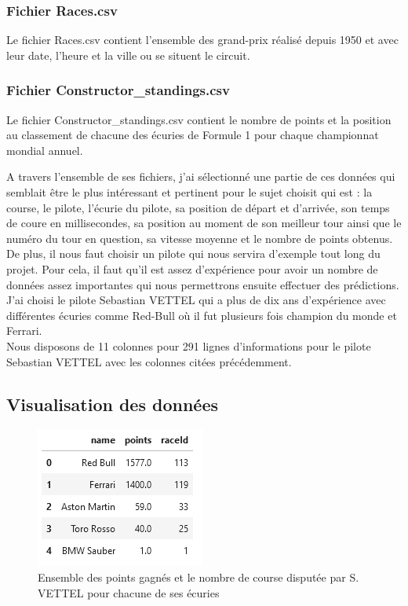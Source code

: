 \subsubsection{Fichier Races.csv}
Le fichier Races.csv contient l'ensemble des grand-prix réalisé depuis 1950 et avec leur date, l'heure et la ville ou se situent le circuit.

\subsubsection{Fichier Constructor\_standings.csv}
Le fichier Constructor\_standings.csv contient le nombre de points et la position au classement de chacune des écuries de Formule 1 pour chaque championnat mondial annuel.

\newpage

A travers l'ensemble de ses fichiers, j'ai sélectionné une partie de ces données qui semblait être le plus intéressant et pertinent pour le sujet choisit qui est : la course, le pilote, l'écurie du pilote, sa position de départ et d'arrivée, son temps de coure en millisecondes, sa position au moment de son meilleur tour ainsi que le numéro du tour en question, sa vitesse moyenne et le nombre de points obtenus. \\

De plus, il nous faut choisir un pilote qui nous servira d'exemple tout long du projet. Pour cela, il faut qu'il est assez d'expérience pour avoir un nombre de données assez importantes qui nous permettrons ensuite effectuer des prédictions. J'ai choisi le  pilote Sebastian VETTEL qui a plus de dix ans d'expérience avec différentes écuries comme Red-Bull où il fut plusieurs fois champion du monde et Ferrari.\\

Nous disposons de 11 colonnes pour 291 lignes d'informations pour le pilote Sebastian VETTEL avec les colonnes citées précédemment.\\

\subsection{Visualisation des données}
\begin{figure}[H]
    \centering
    \includegraphics[width=.4\textwidth]{images/VettelEcurieScore.png} 
    \caption{Ensemble des points gagnés et le nombre de course disputée par S. VETTEL pour chacune de ses écuries}
\end{figure}

